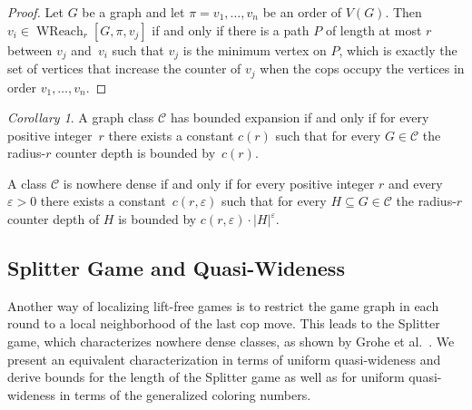 \documentclass[1p,number,a4paper]{elsarticle}
\theoremstyle{remark}
\newcommand{\Cc}{\mathscr{C}}
\renewcommand{\epsilon}{\varepsilon}
\DeclareMathOperator{\wcol}{wcol}
\DeclareMathOperator{\WReach}{WReach}
\newtheorem{corollary}[theorem]{Corollary}
\begin{document}
\begin{proof}
    Let $G$ be a graph and let $\pi=v_1,\ldots, v_n$ be an order of $V(G)$. 
    Then $v_i\in \WReach_r[G,\pi,v_j]$ if and only if there is a path $P$ of length at most $r$ between $v_j$ and~$v_i$ such that $v_j$ is the minimum vertex on $P$, which is exactly the set of vertices that increase the counter of $v_j$ when the cops occupy the vertices in order $v_1,\ldots, v_n$. 
%
%

\end{proof}

\begin{corollary}
    A graph class $\Cc$ has bounded expansion if and only if for every positive integer~$r$ there exists a constant $c(r)$ such that for every $G\in \Cc$ the radius-$r$ counter depth is bounded by~$c(r)$. 

\medskip
A class $\Cc$ is nowhere dense if and only if 
for every positive integer $r$ and every $\epsilon>0$ there exists a constant~$c(r,\epsilon)$ such that 
for every $H\subseteq G\in \Cc$ the radius-$r$ counter depth of $H$ is bounded by $c(r,\epsilon)\cdot |H|^\epsilon$. 
\end{corollary}

\subsection{Splitter Game and Quasi-Wideness}

Another way of localizing lift-free games is to restrict the game graph in each round to a local neighborhood of the last cop move. 
This leads to the Splitter game, which characterizes nowhere dense classes, as shown by Grohe et al.~\cite{grohe2017deciding}. 
We present an equivalent characterization in terms of uniform quasi-wideness and derive bounds for the length of the Splitter game as well as for uniform quasi-wideness in terms of the generalized coloring numbers.
\end{document}
